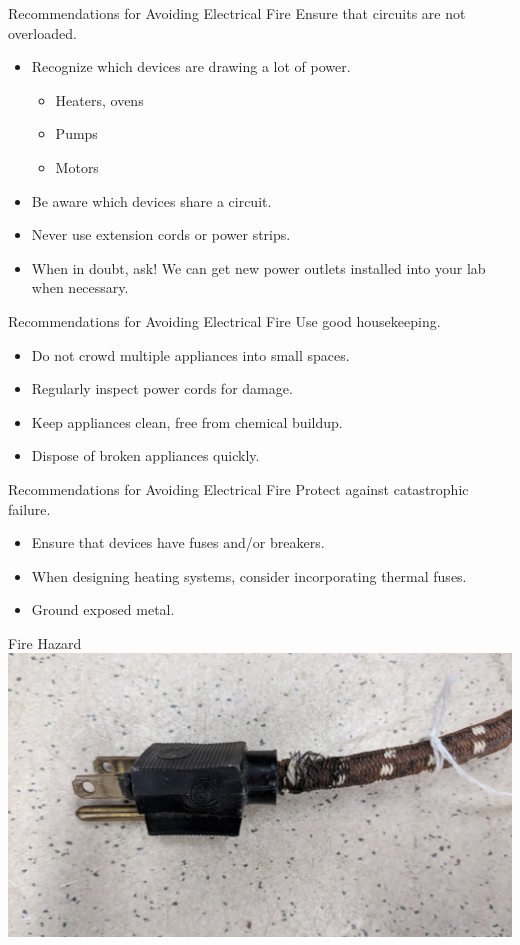 \documentclass{presentation}
\begin{document}
\begin{frame}{Recommendations for Avoiding Electrical Fire}
  Ensure that circuits are not overloaded.
  \begin{itemize}
    \item Recognize which devices are drawing a lot of power.
    \begin{itemize}
      \item Heaters, ovens
      \item Pumps
      \item Motors
    \end{itemize}
    \item Be aware which devices share a circuit.
    \item Never use extension cords or power strips.
    \item When in doubt, ask! We can get new power outlets installed into your lab when necessary.
  \end{itemize}
\end{frame}

\begin{frame}{Recommendations for Avoiding Electrical Fire}
  Use good housekeeping.
  \begin{itemize}
    \item Do not crowd multiple appliances into small spaces.
    \item Regularly inspect power cords for damage.
    \item Keep appliances clean, free from chemical buildup.
    \item Dispose of broken appliances quickly.
  \end{itemize}
\end{frame}

\begin{frame}{Recommendations for Avoiding Electrical Fire}
  Protect against catastrophic failure.
  \begin{itemize}
    \item Ensure that devices have fuses and/or breakers.
    \item When designing heating systems, consider incorporating thermal fuses.
    \item Ground exposed metal.
  \end{itemize}
\end{frame}

\begin{frame}{Fire Hazard}
  \includegraphics[width=\textwidth]{"./IMG_20181009_153609.jpg"}
\end{frame}
\end{document}
